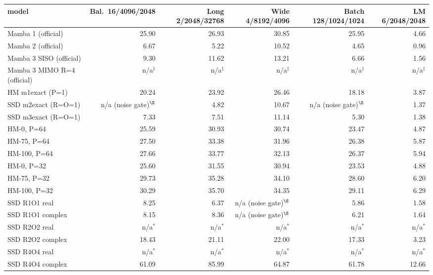 \begin{tabular}{l r r r r r }
\toprule
model & Bal.\ 16/4096/2048 & Long 2/2048/32768 & Wide 4/8192/4096 & Batch 128/1024/1024 & LM 6/2048/2048 \\
\midrule
Mamba 1 (official) & 25.90 & 26.93 & 30.85 & 25.95 & 4.66 \\
Mamba 2 (official) & 6.67 & 5.22 & 10.52 & 4.65 & 0.96 \\
Mamba 3 SISO (official) & 9.30 & 11.62 & 13.21 & 6.66 & 1.56 \\
Mamba 3 MIMO R=4 (official) & n/a$^\ddagger$ & n/a$^\ddagger$ & n/a$^\ddagger$ & n/a$^\ddagger$ & n/a$^\ddagger$ \\
HM m1exact (P=1) & 20.24 & 23.92 & 26.46 & 18.18 & 3.87 \\
SSD m2exact (R=O=1) & n/a (noise gate)$^\S$ & 4.82 & 10.67 & n/a (noise gate)$^\S$ & 1.37 \\
SSD m3exact (R=O=1) & 7.33 & 7.51 & 11.14 & 5.30 & 1.38 \\
HM-0, P=64 & 25.59 & 30.93 & 30.74 & 23.47 & 4.87 \\
HM-75, P=64 & 27.50 & 33.38 & 31.96 & 26.38 & 5.87 \\
HM-100, P=64 & 27.66 & 33.77 & 32.13 & 26.37 & 5.94 \\
HM-0, P=32 & 25.60 & 31.55 & 30.94 & 23.53 & 4.88 \\
HM-75, P=32 & 29.73 & 35.28 & 34.10 & 28.60 & 6.20 \\
HM-100, P=32 & 30.29 & 35.70 & 34.35 & 29.11 & 6.29 \\
SSD R1O1 real & 8.25 & 6.37 & n/a (noise gate)$^\S$ & 5.86 & 1.58 \\
SSD R1O1 complex & 8.15 & 8.36 & n/a (noise gate)$^\S$ & 6.21 & 1.64 \\
SSD R2O2 real & n/a$^\ast$ & n/a$^\ast$ & n/a$^\ast$ & n/a$^\ast$ & n/a$^\ast$ \\
SSD R2O2 complex & 18.43 & 21.11 & 22.00 & 17.33 & 3.23 \\
SSD R4O4 real & n/a$^\ast$ & n/a$^\ast$ & n/a$^\ast$ & n/a$^\ast$ & n/a$^\ast$ \\
SSD R4O4 complex & 61.09 & 85.99 & 64.87 & 61.78 & 12.66 \\
\bottomrule
\end{tabular}

